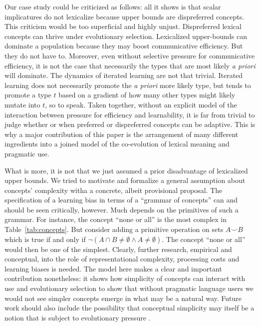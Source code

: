 \documentclass[a4paper, 11pt]{article}
\theoremstyle{Satz}
\begin{document}
Our case study could be criticized as follows: all it shows is that scalar implicatures do not
lexicalize because upper bounds are dispreferred concepts. This criticism would be too
superficial and highly unjust. Dispreferred lexical concepts can thrive under evolutionary
selection. Lexicalized upper-bounds can dominate a population because they may boost
communicative efficiency. But they do not have to. Moreover, even without selective pressure
for communicative efficiency, it is not the case that necessarily the types that are most
likely \emph{a priori} will dominate. The dynamics of iterated learning are not that
trivial. Iterated learning does not necessarily promote the \emph{a priori} more likely type,
but tends to promote a type $t$ based on a gradient of how many other types might likely mutate
into $t$, so to speak. Taken together, without an explicit model of the interaction between
pressure for efficiency and learnability, it is far from trivial to judge whether or when
preferred or dispreferred concepts can be adaptive. This is why a major contribution of this
paper is the arrangement of many different ingredients into a joined model of the co-evolution
of lexical meaning and pragmatic use. 

What is more, it is not that we just assumed a prior disadvantage of lexicalized upper
bounds. We tried to motivate and formalize a general assumption about concepts' complexity
witha a concrete, albeit provisional proposal. The specification of a learning bias in terms of
a ``grammar of concepts'' can and should be seen critically, however. Much depends on the
primitives of such a grammar. For instance, the concept ``none or all'' is the most complex in
Table~\ref{tab:concepts}. But consider adding a primitive operation on sets $A \smile B$
which is true if and only if $\neg(A \cap B \neq \emptyset \wedge A \neq \emptyset)$. The
concept ``none or all'' would then be one of the simplest. Clearly, further research, empirical
and conceptual, into the role of representational complexity, processing costs and learning
biases is needed. The model here makes a clear and important contribution nonetheless: it shows
how simplicity of concepts can interact with use and evolutionary selection to show that
without pragmatic language users we would not see simpler concepts emerge in what may be a
natural way. Future work should also include the possibility that conceptual simplicity may
itself be a notion that is subject to evolutionary pressure
\citep[c.f.][]{ThompsonKirby2016:Culture-Shapes-}. 
\end{document}
